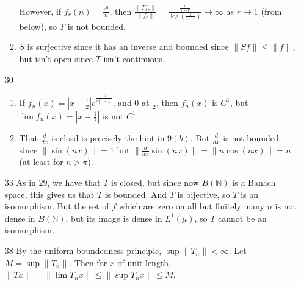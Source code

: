 \documentclass{article}
\newcommand\NN{\mathbb N}
\begin{document}
\begin{enumerate}
\begin{enumerate}
            However, if $f_r(n) = \frac{r^n}{n}$, then $\frac{\|Tf_r\|}{\|f_r\|}
            = \frac{\frac{r}{1-r}}{\log(\frac{1}{1-r})} \to \infty$ as $r \to 1$
            (from below), so $T$ is not bounded.

         \item $S$ is surjective since it has an inverse and bounded since
            $\|Sf\| \leq \|f\|$, but isn't open since $T$ isn't continuous.
      \end{enumerate}

   \item[30] \begin{enumerate}
         \item If $f_n(x) = |x-\frac12|e^{\frac{-1}{n|x-\frac12|}}$, and 0 at
         $\frac12$, then $f_n(x)$ is $C^1$, but $\lim f_n(x) = |x-\frac12|$ is
         not $C^1$.

         \item That $\frac{d}{dx}$ is closd is precisely the hint in $9(b)$. But
            $\frac{d}{dx}$ is not bounded since $\|\sin(nx)\| = 1$ but
            $\|\frac{d}{dx}\sin(nx)\| = \|n\cos(nx)\| = n$ (at least for $n >
            \pi$).
      \end{enumerate}

   \item[33] As in 29, we have that $T$ is closed, but since now $B(\NN)$ is a
      Banach space, this gives us that $T$ is bounded. And $T$ is bijective, so
      $T$ is an isomorphism. But the set of $f$ which are zero on all but
      finitely many $n$ is not dense in $B(\NN)$, but its image is dense in
      $L^1(\mu)$, so $T$ cannot be an isomorphism.

   \item[38] By the uniform boundedness principle, $\sup \|T_n\| < \infty$. Let
      $M = \sup \|T_n\|$. Then for $x$ of unit length, $\|Tx\| = \|\lim T_nx\|
      \leq \|\sup T_nx\| \leq M$.
\end{enumerate}
\end{document}
